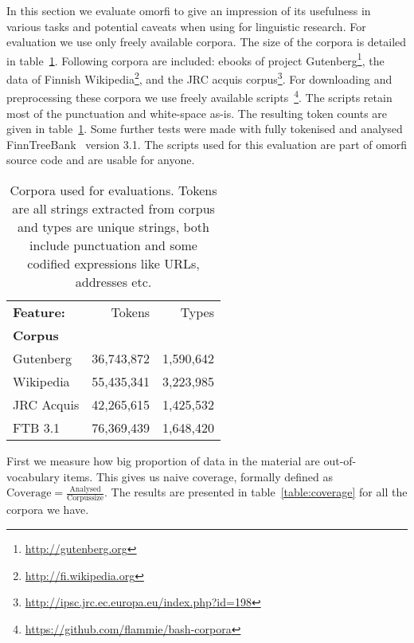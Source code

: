\documentclass[a4paper,12pt]{article}
\begin{document}
In this section we evaluate omorfi to give an impression of its usefulness
in various tasks and potential caveats when using for linguistic research.
For evaluation we use only freely available corpora. The size of the corpora
is detailed in table~\ref{table:corpora}. Following corpora are included:
ebooks of project Gutenberg\footnote{\url{http://gutenberg.org}}, the data
of Finnish Wikipedia\footnote{\url{http://fi.wikipedia.org}}, and the JRC
acquis corpus\footnote{\url{http://ipsc.jrc.ec.europa.eu/index.php?id=198}}.
For downloading and preprocessing these corpora we use freely available
scripts~\footnote{\url{https://github.com/flammie/bash-corpora}}. The
scripts retain most of the punctuation and white-space as-is. The resulting
token counts are given in table~\ref{table:corpora}. Some further tests were
made with fully tokenised and analysed
FinnTreeBank~\citep{voutilainen2012specifying} version 3.1.  The scripts
used for this evaluation are part of omorfi source code and are usable for
anyone.

\begin{table}
    \begin{scriptsize}
  \centering
    \begin{tabular}{|l|r|r|}
        \hline
        \bf Feature: & Tokens     & Types     \\
        \bf Corpus   &            &           \\
        \hline
        Gutenberg    & 36,743,872 & 1,590,642 \\
        Wikipedia    & 55,435,341 & 3,223,985 \\
        JRC Acquis   & 42,265,615 & 1,425,532 \\
        FTB 3.1      & 76,369,439 & 1,648,420 \\
        \hline
    \end{tabular}
  \caption{Corpora used for evaluations. Tokens are all strings extracted from
      corpus and types are unique strings, both include punctuation and some
      codified expressions like URLs, addresses etc.
  \label{table:corpora}}
  \end{scriptsize}
\end{table}

First we measure how big proportion of data in the material are
out-of-vocabulary items. This gives us naive coverage, formally defined as
$\mathrm{Coverage} = \frac{\mathrm{Analysed}}{\mathrm{Corpus size}}$.
The results are presented in table~\ref{table:coverage} for all the
corpora we have.
\end{document}
